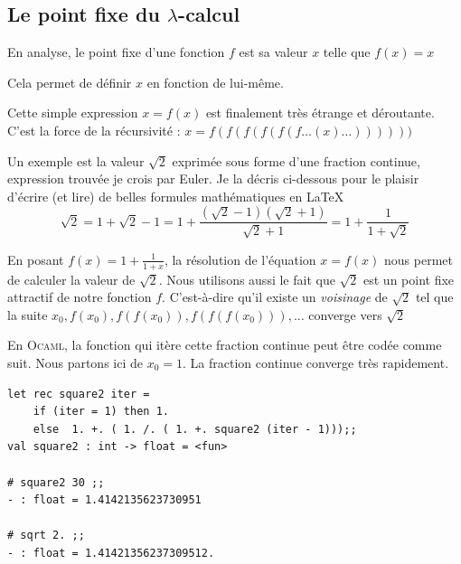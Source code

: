 \subsection{Le point fixe du $\lambda$-calcul} %

En analyse, le point fixe d'une fonction $f$ est sa valeur $x$ telle que $f(x)=x$

Cela permet de définir $x$ en fonction de lui-même.

Cette simple expression $x=f(x)$ est finalement très étrange et déroutante.
C'est la force de la récursivité : $x=f(f(f(f(f(f\ldots (x)\ldots))))))$

Un exemple est la valeur $\sqrt{2}$ exprimée sous forme d'une fraction continue,
expression trouvée je crois par Euler.
Je la décris ci-dessous  pour le plaisir d'écrire (et lire) de belles formules mathématiques en \LaTeX
\cite{lamport1994latex}
$$
\sqrt{2} = 1+\sqrt{2} -1
= 1+ \frac{(\sqrt{2} -1)(\sqrt{2} +1)}{\sqrt{2} +1}
= 1 + \frac{1}{1+\sqrt{2}}
$$




En posant $ f(x) = 1 + \frac{1}{1+x} $, la résolution de l'équation $x=f(x)$ nous permet
de calculer la valeur de $\sqrt{2}$. Nous utilisons aussi le fait que $\sqrt{2}$ est 
un point fixe attractif de notre fonction $f$. C'est-à-dire qu'il existe un \textit{voisinage} de 
$\sqrt{2}$ tel que la suite $ x_0,f(x_0),f(f(x_0)),f(f(f(x_0))),\dots $ converge vers $\sqrt{2}$


En \textsc{Ocaml}, la fonction qui it\`{e}re cette fraction continue peut être codée comme suit. 
Nous partons ici de $x_0 =1$. La fraction continue converge très rapidement.
\begin{Verbatim}
let rec square2 iter =
	if (iter = 1) then 1.
	else  1. +. ( 1. /. ( 1. +. square2 (iter - 1)));;
val square2 : int -> float = <fun>

# square2 30 ;;
- : float = 1.4142135623730951

# sqrt 2. ;;
- : float = 1.41421356237309512.

\end{Verbatim}


